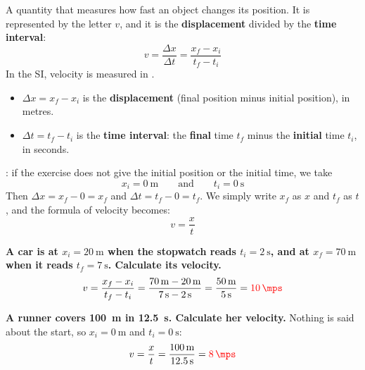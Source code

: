 \begin{definition}[Velocity]
    A quantity that measures how fast an object changes its position. It is represented by the letter \(v\), and it is the \textbf{displacement} divided by the \textbf{time interval}:
    \begin{equation*}
        v = \dfrac{\Delta x}{\Delta t} = \dfrac{x_f - x_i}{t_f - t_i}
    \end{equation*}
    In the SI, velocity is measured in \unit{\mps}.
\end{definition}

\begin{itemize}
    \item \(\Delta x = x_f - x_i\) is the \textbf{displacement} (final position minus initial position), in metres.
    \item \(\Delta t = t_f - t_i\) is the \textbf{time interval}: the \textbf{final} time \(t_f\) minus the \textbf{initial} time \(t_i\), in seconds.
\end{itemize}

\begin{impt}
    : if the exercise does not give the initial position or the initial time, we take
    \begin{equation*}
        x_i = \qty{0}{\m} \qquad\text{and}\qquad t_i = \qty{0}{\s}
    \end{equation*}
    Then \(\Delta x = x_f - 0 = x_f\) and \(\Delta t = t_f - 0 = t_f\). We simply write \(x_f\) as \(x\) and \(t_f\) as \(t\), and the formula of velocity becomes:
    \begin{equation*}
        v = \dfrac{x}{t}
    \end{equation*}
\end{impt}

\begin{example}
    \textbf{A car is at \(x_i = \qty{20}{\m}\) when the stopwatch reads \(t_i = \qty{2}{\s}\), and at \(x_f = \qty{70}{\m}\) when it reads \(t_f = \qty{7}{\s}\). Calculate its velocity.}
    \begin{equation*}
        v = \dfrac{x_f - x_i}{t_f - t_i} = \dfrac{\qty{70}{\m} - \qty{20}{\m}}{\qty{7}{\s} - \qty{2}{\s}} = \dfrac{\qty{50}{\m}}{\qty{5}{\s}} = \textcolor{red}{\qty{10}{\mps}}
    \end{equation*}
\end{example}

\begin{example}
    \textbf{A runner covers \qty{100}{\m} in \qty{12.5}{\s}. Calculate her velocity.} Nothing is said about the start, so \(x_i = \qty{0}{\m}\) and \(t_i = \qty{0}{\s}\):
    \begin{equation*}
        v = \dfrac{x}{t} = \dfrac{\qty{100}{\m}}{\qty{12.5}{\s}} = \textcolor{red}{\qty{8}{\mps}}
    \end{equation*}
\end{example}

